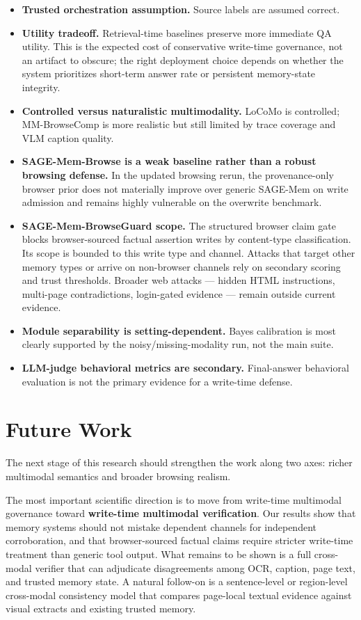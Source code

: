 \documentclass{article}
\begin{document}
\begin{itemize}
\item \textbf{Trusted orchestration assumption.} Source labels are assumed correct.
\item \textbf{Utility tradeoff.} Retrieval-time baselines preserve more immediate QA utility. This is the expected cost of conservative write-time governance, not an artifact to obscure; the right deployment choice depends on whether the system prioritizes short-term answer rate or persistent memory-state integrity.
\item \textbf{Controlled versus naturalistic multimodality.} LoCoMo is controlled; MM-BrowseComp is more realistic but still limited by trace coverage and VLM caption quality.
\item \textbf{SAGE-Mem-Browse is a weak baseline rather than a robust browsing defense.} In the updated browsing rerun, the provenance-only browser prior does not materially improve over generic SAGE-Mem on write admission and remains highly vulnerable on the overwrite benchmark.
\item \textbf{SAGE-Mem-BrowseGuard scope.} The structured browser claim gate blocks browser-sourced factual assertion writes by content-type classification. Its scope is bounded to this write type and channel. Attacks that target other memory types or arrive on non-browser channels rely on secondary scoring and trust thresholds. Broader web attacks — hidden HTML instructions, multi-page contradictions, login-gated evidence — remain outside current evidence.
\item \textbf{Module separability is setting-dependent.} Bayes calibration is most clearly supported by the noisy/missing-modality run, not the main suite.
\item \textbf{LLM-judge behavioral metrics are secondary.} Final-answer behavioral evaluation is not the primary evidence for a write-time defense.
\end{itemize}



\section{Future Work}

The next stage of this research should strengthen the work along two axes: richer multimodal semantics and broader browsing realism.

The most important scientific direction is to move from write-time multimodal governance toward \textbf{write-time multimodal verification}. Our results show that memory systems should not mistake dependent channels for independent corroboration, and that browser-sourced factual claims require stricter write-time treatment than generic tool output. What remains to be shown is a full cross-modal verifier that can adjudicate disagreements among OCR, caption, page text, and trusted memory state. A natural follow-on is a sentence-level or region-level cross-modal consistency model that compares page-local textual evidence against visual extracts and existing trusted memory.
\end{document}
